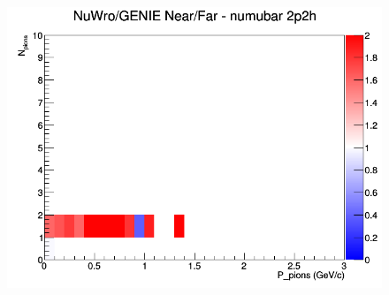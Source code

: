 \documentclass[12pt]{article}
\begin{document}
\begin{figure}[h]
\endminipage
{}
\includegraphics[width=\linewidth]{N_P/nominal/pions/ratios/2p2h_NuWro_GENIE_numubar_NF_N_P.png}
\endminipage
\newline
\end{figure}
\clearpage
\end{document}
